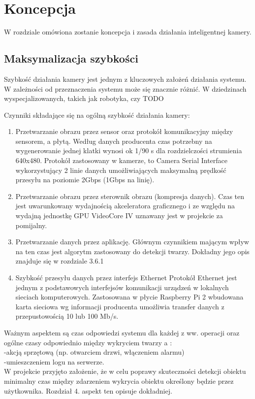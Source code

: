 \chapter{Koncepcja}

W rozdziale omówiona zostanie koncepcja i zasada działania inteligentnej kamery. 

\section{Maksymalizacja szybkości}
 
Szybkość działania kamery jest jednym z kluczowych założeń działania systemu. W zależności od przeznaczenia systemu może się znacznie różnić. W dziedzinach wyspecjalizowanych, takich jak robotyka, czy TODO
\begin{description}
\item Czynniki składające się na ogólną szybkość działania kamery:
	\begin{enumerate}[noitemsep]
	\item Przetwarzanie obrazu przez sensor oraz protokół komunikacyjny między sensorem, a płytą.
Według danych producenta czas potrzebny na wygenerowanie jednej klatki wynosi ok 1/90 s dla rozdzielczości strumienia 640x480. Protokół zastosowany w kamerze, to Camera Serial Interface wykorzystujący 2 linie danych umożliwiających maksymalną prędkość przesyłu na poziomie 2Gbps (1Gbps na linię).
\item Przetwarzanie obrazu przez sterownik obrazu (kompresja danych).
Czas ten jest uwarunkowany wydajnością akceleratora graficznego i  ze względu na wydajną jednostkę GPU VideoCore IV uznawany jest w projekcie za pomijalny.
\item Przetwarzanie danych przez aplikację.
Głównym czynnikiem mającym wpływ na ten czas jest algorytm zastosowany do detekcji twarzy. Dokładny jego opis znajduje się w rozdziale 3.6.1
\item Szybkość przesyłu danych przez interfejs Ethernet
Protokół Ethernet jest jednym z podstawowych interfejsów komunikacji urządzeń w lokalnych sieciach komputerowych. Zastosowana w płycie Raspberry Pi 2 wbudowana karta sieciowa wg informacji producenta umożliwia transfer danych z przepustowością 10 lub 100 Mb/s.
		\end{enumerate}
\end{description}

Ważnym aspektem są czas odpowiedzi systemu dla każdej z ww. operacji oraz ogólne czasy odpowiednio między wykryciem twarzy a : \\
-akcją sprzętową (np. otwarciem drzwi, włączeniem alarmu)\\
-umieszczeniem logu na serwerze.\\
W projekcie przyjęto założenie, że w celu poprawy skuteczności detekcji obiektu minimalny czas między zdarzeniem wykrycia obiektu określony będzie przez użytkownika. Rozdział  4. aspekt ten opisuje dokładniej.

